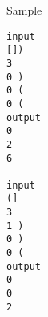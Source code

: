 Sample
\begin{verbatim}
input 
[]) 
3 
0 ) 
0 ( 
0 ( 
output 
0 
2 
6 

input 
(] 
3 
1 ) 
0 ) 
0 ( 
output 
0 
0 
2 
\end{verbatim}